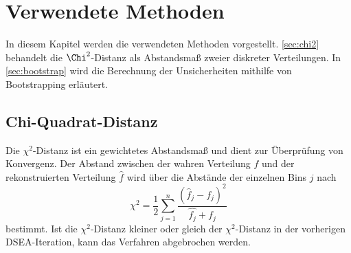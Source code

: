 \chapter{Verwendete Methoden}
In diesem Kapitel werden die verwendeten Methoden vorgestellt.
\autoref{sec:chi2} behandelt die $\Chi^2$-Distanz als Abstandsmaß zweier diskreter Verteilungen.
In \autoref{sec:bootstrap} wird die Berechnung der Unsicherheiten mithilfe von Bootstrapping erläutert.

\section{Chi-Quadrat-Distanz} \label{sec:chi2}
Die $\chi^2$-Distanz\cite{LIU20022617} ist ein gewichtetes Abstandsmaß und dient zur Überprüfung von Konvergenz.
Der Abstand zwischen der wahren Verteilung $f$ und der rekonstruierten Verteilung $\hat{f}$ wird über die Abstände der einzelnen Bins $j$ nach
\begin{equation}
    \chi^2 = \frac{1}{2} \sum_{j=1}^{n} \frac{(\hat{f}_j - f_j)^2}{\hat{f_j} + f_j}
\end{equation}
bestimmt.
Ist die $\chi^2$-Distanz kleiner oder gleich der $\chi^2$-Distanz in der vorherigen DSEA-Iteration, kann das Verfahren abgebrochen werden.

